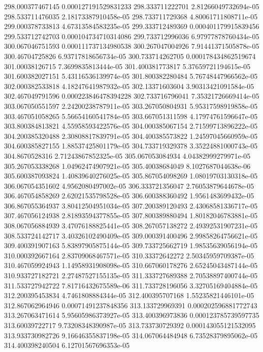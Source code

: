 {298.000377467145 0.000127191529831233
298.333711222701 2.81266049732694e-05
298.533711476035 2.18173387910458e-05
298.733711729368 4.80061711808711e-05
299.000378733813 4.67313584583235e-05
299.333712489369 0.000401179915839456
299.533712742703 0.000104734710314086
299.733712996036 6.97977878760434e-05
300.067046751593 0.000111737134980538
300.267047004926 7.91441371505878e-05
300.46704725826 6.93717818656734e-05
300.733714262705 0.000178434862519674
301.00038126715 7.3699835813444e-05
301.400381773817 5.37659721194615e-05
301.600382027151 5.43116536139974e-05
301.800382280484 5.76748447966562e-05
302.000382533818 4.18247641987932e-05
302.13371603604 3.90313421091584e-05
302.467049791596 0.000223846478394228
302.733716796041 7.35321726669414e-05
303.067050551597 2.24200238787911e-05
303.267050804931 5.95317598919858e-05
303.467051058265 5.56654160541784e-05
303.667051311598 4.17974761596647e-05
303.800384813821 4.55958593422576e-05
304.000385067154 2.71599713896222e-05
304.200385320488 2.30808817839791e-05
304.400385573822 1.24597045660959e-05
304.600385827155 1.88537425801179e-05
304.733719329378 3.35224881000743e-05
304.8670528316 2.71243867852325e-05
305.067053084934 4.04382999279971e-05
305.267053338268 1.04962474907921e-05
305.40038684049 8.1027687044638e-06
305.600387093824 1.40839640276025e-05
305.867054098269 1.08019703130318e-05
306.067054351602 4.9562080497002e-05
306.333721356047 2.76053879644678e-05
306.467054858269 2.62021535798528e-05
306.600388360492 1.9561483699432e-05
306.867055364937 3.80412504951034e-05
307.200389120493 2.43068581336717e-05
307.467056124938 2.81893594377855e-05
307.800389880494 1.80182046783881e-05
308.067056884939 3.47076188825441e-05
308.267057138272 2.49392531907231e-05
308.533724142717 3.40326102490409e-05
309.000391400496 2.99858264756621e-05
309.400391907163 5.83897905875144e-05
309.733725662719 1.98535639056194e-05
310.000392667164 2.83709068467571e-05
310.33372642272 2.50345959709387e-05
310.467059924943 1.14958931908098e-05
310.667060178276 2.65245043487144e-05
310.933727182721 2.27487527155135e-05
311.333727689388 2.70538897400744e-05
311.533727942722 7.81716432675589e-06
311.733728196056 3.32705169404884e-05
312.200395453834 4.7461808884344e-05
312.400395707168 1.55235821446101e-05
312.867062964946 0.00071491237848356
313.133729969391 0.000202596881772743
313.267063471614 5.95605986373927e-05
313.400396973836 0.000123785739597735
313.60039722717 9.73208348390987e-05
313.733730729392 0.000143055121532095
313.933730982726 9.16646355837198e-05
314.067064484948 6.73528379895062e-05
314.400398240504 6.12701567696353e-05
}
